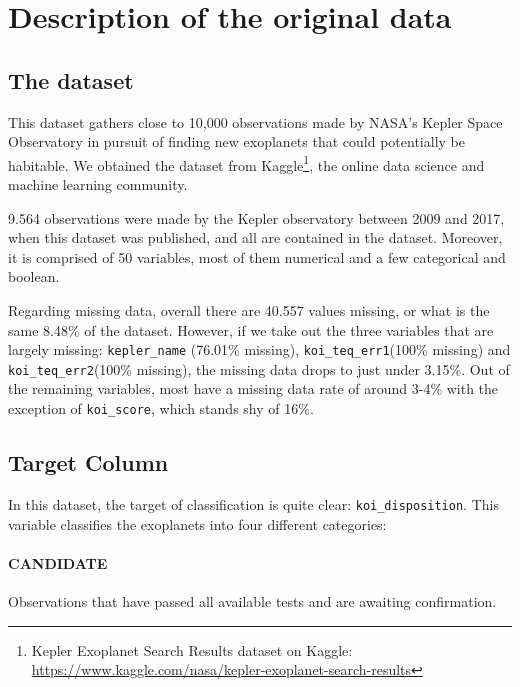 
\section{Description of the original data}%
\label{sec:desc-orig}



\subsection{The dataset}

This dataset gathers close to 10,000 observations made by NASA's 
Kepler Space Observatory in pursuit of finding new exoplanets that
could potentially be habitable. 
We obtained the dataset from Kaggle\footnote{Kepler Exoplanet Search Results 
dataset on Kaggle:
\url{https://www.kaggle.com/nasa/kepler-exoplanet-search-results}},
the online data science and machine learning community.

9.564 observations were made by the Kepler observatory between 2009 and
2017, when this dataset was published, and all are contained in the dataset.
Moreover, it is comprised of 50 variables, most of them numerical and a few
categorical and boolean.

Regarding missing data, overall there are 40.557 values
missing, or what is the same 8.48\% of the dataset. However, if we take out the
three variables that are largely missing: \texttt{kepler\_name}
(76.01\% missing), \texttt{koi\_teq\_err1}(100\% missing) and 
\texttt{koi\_teq\_err2}(100\% missing), the missing data drops
to just under 3.15\%. Out of the remaining variables, most have a missing
data rate of around 3-4\% with the exception of \texttt{koi\_score}, which
stands shy of 16\%.

\subsection{Target Column}

In this dataset, the target of classification is quite clear:
\texttt{koi\_disposition}. This variable classifies the exoplanets into
four different categories:

    \paragraph{CANDIDATE} Observations that have passed all available tests
    and are awaiting confirmation.
    
